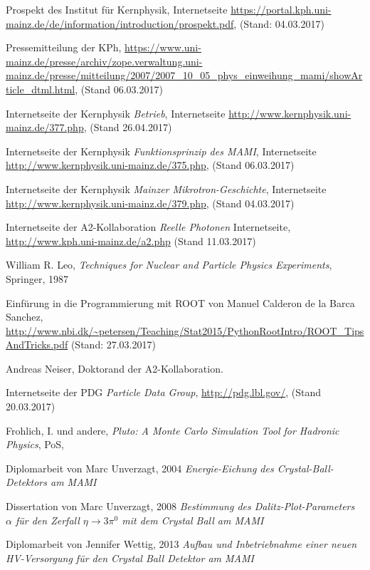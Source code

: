 \documentclass[a4paper,11pt,oneside,final,german,openbib,pdftex]{scrbook}
\begin{document}
{\begin{appendix}
\begin{thebibliography}{99}
 Prospekt des Institut für Kernphysik, Internetseite \url{https://portal.kph.uni-mainz.de/de/information/introduction/prospekt.pdf}, (Stand: 04.03.2017)

 Pressemitteilung der KPh, \url{https://www.uni-mainz.de/presse/archiv/zope.verwaltung.uni-mainz.de/presse/mitteilung/2007/2007_10_05_phys_einweihung_mami/showArticle_dtml.html}, (Stand 06.03.2017)


 Internetseite der Kernphysik {\em Betrieb}, Internetseite \url{http://www.kernphysik.uni-mainz.de/377.php}, (Stand 26.04.2017)


 Internetseite der Kernphysik {\em Funktionsprinzip des MAMI}, Internetseite \url{http://www.kernphysik.uni-mainz.de/375.php}, (Stand 06.03.2017)


 Internetseite der Kernphysik {\em Mainzer Mikrotron-Geschichte}, Internetseite \url{http://www.kernphysik.uni-mainz.de/379.php}, (Stand 04.03.2017)


 Internetseite der A2-Kollaboration {\em Reelle Photonen}
Internetseite, \url{http://www.kph.uni-mainz.de/a2.php} (Stand 11.03.2017)


 William R. Leo, \textit{Techniques for Nuclear and Particle Physics Experiments}, Springer, 1987

 Einf\"urung in die Programmierung mit ROOT von Manuel Calderon de la Barca Sanchez, \url{http://www.nbi.dk/~petersen/Teaching/Stat2015/PythonRootIntro/ROOT_TipsAndTricks.pdf} (Stand: 27.03.2017)


 Andreas Neiser, Doktorand der A2-Kollaboration.

 Internetseite der PDG {\em Particle Data Group}, \url{http://pdg.lbl.gov/}, (Stand 20.03.2017)

 Frohlich, I. und andere, \textit{Pluto: A Monte Carlo Simulation Tool for Hadronic
	Physics}, PoS,

	
 Diplomarbeit von Marc Unverzagt, 2004 {\em Energie-Eichung des Crystal-Ball-Detektors am MAMI}

 Dissertation von Marc Unverzagt, 2008 {\em Bestimmung des Dalitz-Plot-Parameters $\alpha$ für den Zerfall $ \eta \rightarrow 3\pi^{0} $ mit dem Crystal Ball am MAMI}

 Diplomarbeit von Jennifer Wettig, 2013 {\em Aufbau und Inbetriebnahme einer neuen HV-Versorgung für den Crystal Ball Detektor am MAMI}









\end{thebibliography}
\end{appendix}}
\end{document}

